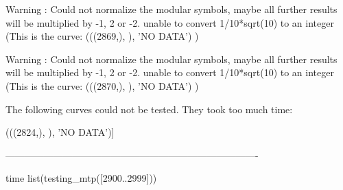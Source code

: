 Warning : Could not normalize the modular symbols, maybe all further results will be multiplied by -1, 2 or -2.
unable to convert 1/10*sqrt(10) to an integer   (This is the curve:  (((2869,), {}), 'NO DATA') )

Warning : Could not normalize the modular symbols, maybe all further results will be multiplied by -1, 2 or -2.
unable to convert 1/10*sqrt(10) to an integer    (This is the curve:  (((2870,), {}), 'NO DATA') )


The following curves could not be tested.
They took too much time:

(((2824,), {}), 'NO DATA')]

 -------------------------------------------------------------------------------

 time list(testing_mtp([2900..2999]))

